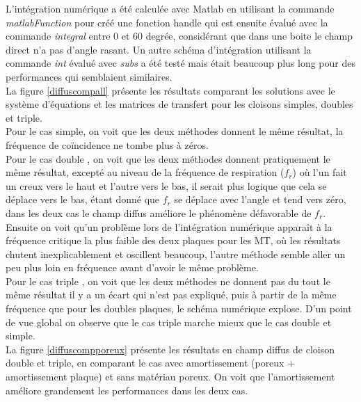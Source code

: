 \documentclass[12pt,foolscap]{report}
\begin{document}
	L'intégration numérique a été calculée avec Matlab en utilisant la commande \textit{matlabFunction} pour créé une fonction handle qui est ensuite évalué avec la commande \textit{integral} entre 0 et 60 degrée, considérant que dans une boite le champ direct n'a pas d'angle rasant. Un autre schéma d'intégration utilisant la commande \textit{int} évalué avec \textit{subs} a été testé mais était beaucoup plus long pour des performances qui semblaient similaires. \\
	La figure \ref{diffuscompall} présente les résultats comparant les solutions avec le système d'équations et les matrices de transfert pour les cloisons simples, doubles et triple.\\
	Pour le cas simple, on voit que les deux méthodes donnent le même résultat, la fréquence de coïncidence ne tombe plus à zéros. \\
	Pour le cas double , on voit que les deux méthodes donnent pratiquement le même résultat, excepté au niveau de la fréquence de respiration ($f_r$) où l'un fait un creux vers le haut et l'autre vers le bas, il serait plus logique que cela se déplace vers le bas, étant donné que $f_r$ se déplace avec l'angle et tend vers zéro, dans les deux cas le champ diffus améliore le phénomène défavorable de $f_r$. Ensuite on voit qu'un problème lors de l'intégration numérique apparaît à la fréquence critique la plus faible des deux plaques pour les MT, où les résultats chutent inexplicablement et oscillent beaucoup, l'autre méthode semble aller un peu plus loin en fréquence avant d'avoir le même problème.\\
	Pour le cas triple , on voit que les deux méthodes ne donnent pas du tout le même résultat il y a un écart qui n'est pas expliqué, puis à partir de la même fréquence que pour les doubles plaques, le schéma numérique explose. D'un point de vue global on observe que le cas triple marche mieux que le cas double et simple.\\ 
	
	La figure \ref{diffuscompporeux} présente les résultats en champ diffus de cloison double et triple, en comparant le cas avec amortissement (poreux + amortissement plaque) et sans matériau poreux. On voit que l'amortissement améliore grandement les performances dans les deux cas.
	
\end{document}
